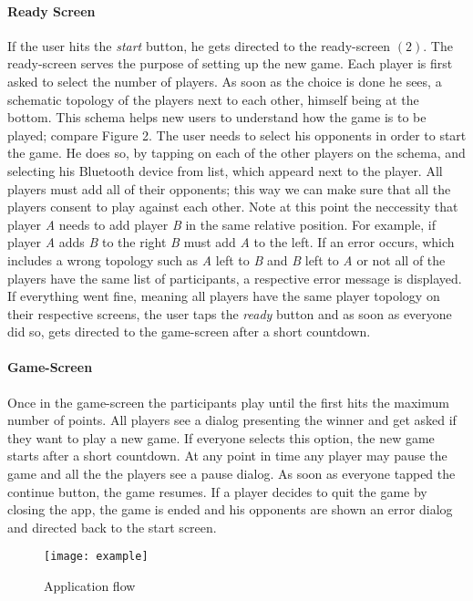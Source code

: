 \documentclass{report}
\newcommand{\lfig}[1]{\label{fig:#1}}
\begin{document}
\paragraph{Ready Screen}
If the user hits the \textit{start} button, he gets directed to the ready-screen $(2)$. The ready-screen serves the purpose of setting up the new game. Each player is first asked to select the number of players. As soon as the choice is done he sees, a schematic topology of the players next to each other, himself being at the bottom. This schema helps new users to understand how the game is to be played; compare Figure 2. The user needs to select his opponents in order to start the game. He does so, by tapping on each of the other players on the schema, and selecting his Bluetooth device from list, which appeard next to the player. All players must add all of their opponents; this way we can make sure that all the players consent to play against each other. Note at this point the neccessity that player \textit{A} needs to add player \textit{B} in the same relative position. For example, if player \textit{A} adds \textit{B} to the right \textit{B} must add \textit{A} to the left. If an error occurs, which includes a wrong topology such as \textit{A} left to \textit{B} and \textit{B} left to \textit{A} or not all of the players have the same list of participants, a respective error message is displayed. If everything went fine, meaning all players have the same player topology on their respective screens, the user taps the \textit{ready} button and as soon as everyone did so, gets directed to the game-screen after a short countdown.

\paragraph{Game-Screen}
Once in the game-screen the participants play until the first hits the maximum number of points. All players see a dialog presenting the winner and get asked if they want to play a new game. If everyone selects this option, the new game starts after a short countdown. At any point in time any player may pause the game and all the the players see a pause dialog. As soon as everyone tapped the continue button, the game resumes. If a player decides to quit the game by closing the app, the game is ended and his opponents are shown an error dialog and directed back to the start screen.

\begin{figure}[h]
	\centering
    \texttt{[image: example]}
    \lfig{example}
    \vspace{-5mm} %
	\caption{Application flow}
\end{figure}
\end{document}

